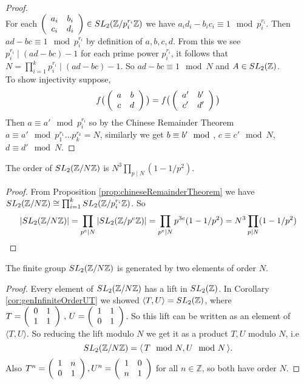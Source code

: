 \begin{proof}
\\ 
For each $\left(\begin{array}{ c c }
         a_i & b_i \\
         c_i & d_i
      \end{array} \right) \in \sltznz[p_{i}^{r_i}]$ we have $a_i d_i - b_i c_i \equiv 1 \mod p_{i}^{r_i}$. Then $ad -bc \equiv 1 \mod p_{i}^{r_i}$ by definition of $a,b,c,d$. From this we see $p_{i}^{r_i} \mid (ad -bc ) -1$ for each prime power $p_{i}^{r_i}$, it follows that $ N = \prod_{i=1}^k p_{i}^{r_i} \mid (ad -bc) -1$. So $ ad -bc \equiv 1 \mod N$ and $A \in \sltz$.
\\
      To show injectivity suppose,
      $$f\big( \left(
      \begin{array}{ c c }
         a & b \\
         c & d
      \end{array} \right) \big) = f\big( \left(
      \begin{array}{ c c }
         a' & b' \\
         c' & d'
      \end{array} \right) \big)$$
      Then $a \equiv a' \mod p_i^{r_i}$ so by the Chinese Remainder Theorem $a \equiv a' \mod  p_{1}^{r_1} \dots p_{k}^{r_k} = N$, similarly we get $b\equiv b' \mod $, $c\equiv c' \mod N$,$d\equiv d' \mod N$.
\end{proof}


\begin{corollary} \label{cor:ordersltznz}
The order of $\sltznz$ is $N^3\prod_{p \mid N}(1 - 1/p^2)$.
\end{corollary}

\begin{proof}
From Proposition \ref{prop:chineseRemainderTheorem} we have $ \sltznz \cong \prod_{i=1}^k \sltznz[p_{i}^{r_i}]$.
So $$\vert \sltznz \vert = \prod_{p^e \mid N}\vert \sltznz[p^e]\vert = \prod_{p^e \mid N}p^{3e}(1 - 1/p^2)  = N^3\prod_{p \mid N}(1 - 1/p^2) $$
\end{proof}


\begin{corollary}\label{cor:generateordern}
The finite group $\sltznz$ is generated by two elements of order $N$. 
\end{corollary}

\begin{proof}
Every element of $\sltznz$ has a lift in $\sltz$. In Corollary \ref{cor:genInfiniteOrderUT} we showed $\langle T, U \rangle = \sltz$, where $T = \left(\begin{array}{ c c }  0& 1 \\ 1 & 1 \end{array} \right)\,,\, U = \left(\begin{array}{ c c }  1& 1 \\ 0 & 1 \end{array} \right)$. So this lift can be written as an element of $\langle T, U \rangle$. So reducing the lift modulo $N$ we get it as a product $T,U$ modulo $N$, i.e 
$$\sltznz = \langle \, T \mod N, U \mod N \, \rangle.$$ 
Also $T^n = \tm[n], U^n = \um[n]$ for all $n \in \mathbb{Z}$, so both have order $N$.
\end{proof}


